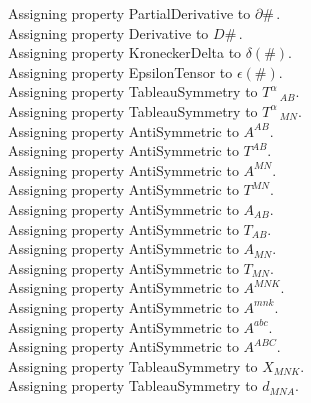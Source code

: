 \documentclass[11pt]{article}
\begin{document}
Assigning property PartialDerivative to $\partial{\#}\, $.
\\
Assigning property Derivative to $D{\#}\, $.
\\
Assigning property KroneckerDelta to $\delta(\#)$.
\\
Assigning property EpsilonTensor to $\epsilon(\#)$.
\\
Assigning property TableauSymmetry to ${T}^{\alpha}\,_{A B}$.
\\
Assigning property TableauSymmetry to ${T}^{\alpha}\,_{M N}$.
\\
Assigning property AntiSymmetric to ${A}^{A B}$.
\\
Assigning property AntiSymmetric to ${T}^{A B}$.
\\
Assigning property AntiSymmetric to ${A}^{M N}$.
\\
Assigning property AntiSymmetric to ${T}^{M N}$.
\\
Assigning property AntiSymmetric to ${A}_{A B}$.
\\
Assigning property AntiSymmetric to ${T}_{A B}$.
\\
Assigning property AntiSymmetric to ${A}_{M N}$.
\\
Assigning property AntiSymmetric to ${T}_{M N}$.
\\
Assigning property AntiSymmetric to ${A}^{M N K}$.
\\
Assigning property AntiSymmetric to ${A}^{m n k}$.
\\
Assigning property AntiSymmetric to ${A}^{a b c}$.
\\
Assigning property AntiSymmetric to ${A}^{A B C}$.
\\
Assigning property TableauSymmetry to ${X}_{M N K}$.
\\
Assigning property TableauSymmetry to ${d}_{M N A}$.
\\
\end{document}
